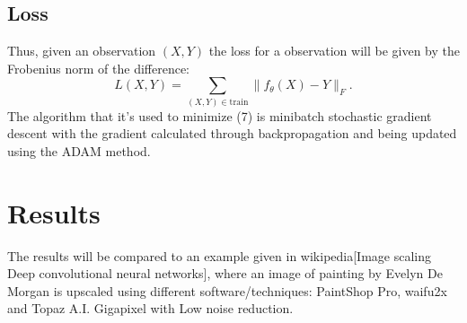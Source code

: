 \documentclass{article}
\theoremstyle{definition}
\begin{document}
\subsection{Loss}
Thus, given an observation $(X,Y)$ the loss for a observation will be given by the Frobenius norm  of the difference:
\begin{equation}
L(X,Y) = \sum_{(X,Y)\in\mbox{train}}\|f_\theta(X)-Y\|_{F}.
\end{equation}  
The algorithm that it's used to minimize (7) is minibatch stochastic gradient descent with the gradient calculated through backpropagation and being updated using the ADAM method. 

\section{Results}
The results will be compared to an example given in wikipedia[Image scaling Deep convolutional neural networks], where an image of painting by Evelyn De Morgan is upscaled using different software/techniques: PaintShop Pro,  waifu2x and Topaz A.I. Gigapixel with Low noise reduction.
\pagebreak
\end{document}

